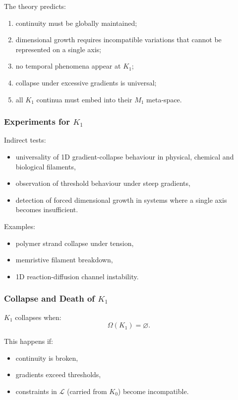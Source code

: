 The theory predicts:
\begin{enumerate}
    \item continuity must be globally maintained;
    \item dimensional growth requires incompatible variations that cannot
          be represented on a single axis;
    \item no temporal phenomena appear at $K_1$;
    \item collapse under excessive gradients is universal;
    \item all $K_1$ continua must embed into their $M_1$ meta-space.
\end{enumerate}

\subsubsection{Experiments for \texorpdfstring{$K_1$}{K_1}}

Indirect tests:
\begin{itemize}
    \item universality of 1D gradient-collapse behaviour in physical,
          chemical and biological filaments,
    \item observation of threshold behaviour under steep gradients,
    \item detection of forced dimensional growth in systems where a
          single axis becomes insufficient.
\end{itemize}

Examples:
\begin{itemize}
    \item polymer strand collapse under tension,
    \item memristive filament breakdown,
    \item 1D reaction-diffusion channel instability.
\end{itemize}

\subsubsection{Collapse and Death of \texorpdfstring{$K_1$}{K_1}}

$K_1$ collapses when:
\[
\Omega(K_1) = \varnothing.
\]

This happens if:
\begin{itemize}
    \item continuity is broken,
    \item gradients exceed thresholds,
    \item constraints in $\mathcal{L}$ (carried from $K_0$) become
          incompatible.
\end{itemize}

